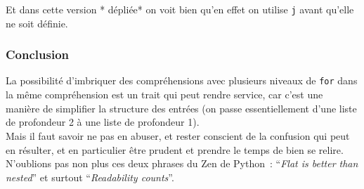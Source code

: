     Et dans cette version * dépliée* on voit bien qu'en effet on utilise
\texttt{j} avant qu'elle ne soit définie.

    \hypertarget{conclusion}{%
\subsubsection{Conclusion}\label{conclusion}}

    La possibilité d'imbriquer des compréhensions avec plusieurs niveaux de
\texttt{for} dans la même compréhension est un trait qui peut rendre
service, car c'est une manière de simplifier la structure des entrées
(on passe essentiellement d'une liste de profondeur 2 à une liste de
profondeur 1).\\

Mais il faut savoir ne pas en abuser, et rester conscient de la
confusion qui peut en résulter, et en particulier être prudent et
prendre le temps de bien se relire. N'oublions pas non plus ces deux
phrases du Zen de Python~: ``\emph{Flat is better than nested}'' et
surtout ``\emph{Readability counts}''.